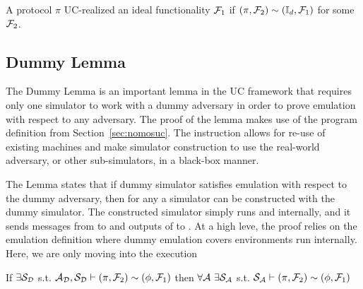 \begin{definition}[UC-Realize]
A protocol $\pi$ UC-realized an ideal functionality $\mathcal{F}_1$ if $(\pi, \mathcal{F}_2) \sim (\mathbb{I}_d, \mathcal{F}_1)$ for some $\mathcal{F}_2$.
\end{definition}

\subsection{Dummy Lemma}
The Dummy Lemma is an important lemma in the UC framework that requires only one simulator to work with a dummy adversary in order to prove emulation with respect to any adversary.
The proof of the lemma makes use of the  program definition from Section~\ref{sec:nomosuc}.
The instruction allows for re-use of existing machines and make simulator construction to use the real-world adversary, or other sub-simulators, in a black-box manner.

The Lemma states that if dummy simulator satisfies emulation with respect to the dummy adversary, then for any \Adversary a simulator can be constructed with the dummy simulator. 
The constructed simulator simply runs \Adversary and \Dummysim internally, and it sends messages from \Environment to \Adversary and outputs of \Adversary to \Dummysim.
At a high leve, the proof relies on the emulation definition where dummy emulation covers environments run \Adversary internally. Here, we are only moving \Adversary into the execution

\begin{theorem}\label{thm:dummy}
If $\exists \mathcal{S}_{\mathcal{D}}$ s.t. $ \mathcal{A}_\mathcal{D}, \mathcal{S}_{\mathcal{D}} \vdash (\pi, \mathcal{F}_2) \sim (\phi, \mathcal{F}_1)$ then $\forall \Adversary \ \exists \Simulator_\Adversary$ s.t. $\mathcal{S}_{\mathcal{A}} \vdash  (\pi, \mathcal{F}_2) \sim (\phi, \mathcal{F}_1)$ 
\end{theorem}

